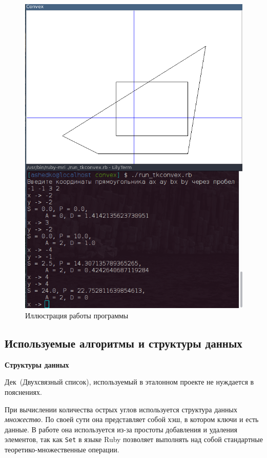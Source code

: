 \begin{figure}[ht!]
\begin{center}
\includegraphics[scale=0.6]{images/convex_ill}
\end{center}
\vspace*{-8mm}
\caption{Иллюстрация работы программы}\label{fig:conv_ill}
\end{figure}

\newpage
\subsection{Используемые алгоритмы и структуры данных}

\textbf{Структуры данных}

Дек~(Двухсвязный список), используемый в эталонном проекте не нуждается в пояснениях.

При вычислении количества острых углов используется структура данных \emph{множество}. По своей сути она представляет собой хэш, в котором ключи и есть данные. В работе она используется из-за простоты добавления и удаления элементов, так как \verb|Set| в языке Ruby позволяет выполнять над собой стандартные теоретико-множественные операции.

